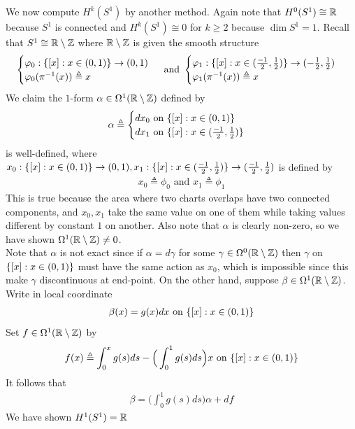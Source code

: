 \documentclass{report}
\begin{document}
\begin{mdframed}
We now compute $H^k(S^1)$ by another method. Again note that $H^0(S^1)\cong  \mathbb{R}$ because $S^1$ is connected and  $H^k(S^1)\cong 0$ for $k\geq 2$ because $\operatorname{dim}S^1=1$. Recall that $S^1\cong  \mathbb{R} \setminus \mathbb{Z}$ where $\mathbb{R} \setminus \mathbb{Z}$ is given the smooth structure 
\begin{align*}
  \begin{cases}
\varphi_0: \{ [x]:x\in (0,1) \}  \rightarrow (0,1) \\
\varphi_0 ( \pi ^{-1}(x))\triangleq x
  \end{cases} \text{ and }\begin{cases}
\varphi_1: \{ [x]:x\in (\frac{-1}{2},\frac{1}{2}) \}  \rightarrow (-\frac{1}{2},\frac{1}{2}) \\
\varphi_1 ( \pi ^{-1}(x))\triangleq x
  \end{cases}
\end{align*}
We claim the $1$-form  $\alpha \in \Omega^1 (\mathbb{R} \setminus \mathbb{Z})$ defined by 
\begin{align*}
\alpha \triangleq \begin{cases}
  dx_0 \text{ on }\{ [x]: x \in (0,1) \} \\
  dx_1\text{ on }\{ [x]:x \in (\frac{-1}{2}, \frac{1}{2}) \}
\end{cases}
\end{align*}
is well-defined, where $x_0: \{ [x]: x \in (0,1) \}\rightarrow (0,1),x_1 : \{ [x]:x \in (\frac{-1}{2}, \frac{1}{2}) \}\rightarrow  (\frac{-1}{2}, \frac{1}{2})$ is defined by 
\begin{align*}
x_0\triangleq \phi_0   \text{ and }x_1 \triangleq \phi_1
\end{align*}
This is true because the area where two charts overlaps have two connected components, and $x_0,x_1$ take the same value on one of them while taking values different by constant $1$ on another. Also note that $\alpha $ is clearly non-zero, so we have shown $\Omega^1 (\mathbb{R} \setminus \mathbb{Z})\neq 0$. \\

Note that $\alpha $ is not exact since if $\alpha = d\gamma $ for some $\gamma \in \Omega^0(\mathbb{R} \setminus \mathbb{Z})$ then $\gamma $ on $\{ [x]: x \in (0,1) \}$ must have the same action as $x_0$, which is impossible since this make  $\gamma $ discontinuous at end-point. On the other hand, suppose $\beta  \in \Omega^1 (\mathbb{R} \setminus \mathbb{Z})$. Write in local coordinate 
\begin{align*}
\beta  (x)=g(x)dx\text{ on }\{ [x]:x \in (0,1) \}
\end{align*}
Set $f\in \Omega^{1}(\mathbb{R} \setminus \mathbb{Z})$ by 
\begin{align*}
f(x)\triangleq \int_0^x g(s)ds - \Big( \int_0^1 g(s)ds \Big)x \text{ on } \{ [x]:x \in (0,1) \}
\end{align*}
It follows that 
\begin{align*}
\beta = \Big( \int_0^1 g(s)ds \Big)\alpha + df
\end{align*}
We have shown $H^1(S^1)=\mathbb{R}$
\end{mdframed}
\end{document}
